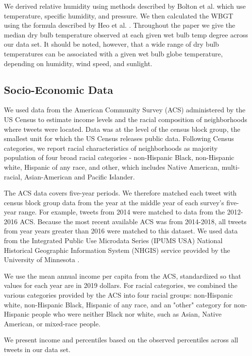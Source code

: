 \documentclass[fleqn,10pt]{wlscirep}
\begin{document}
We derived relative humidity using methods described by Bolton et al. \cite{bolton_computation_1980} which use temperature, specific humidity, and pressure. We then calculated the WBGT using the formula described by Heo et al. \cite{heo2019comparison}.  Throughout the paper we give the median dry bulb temperature observed at each given wet bulb temp degree across our data set. It should be noted, however, that a wide range of dry bulb temperatures can be associated with a given wet bulb globe temperature, depending on humidity, wind speed, and sunlight.

\subsection*{Socio-Economic Data}
We used data from the American Community Survey (ACS) administered by the US Census to estimate income levels and the racial composition of neighborhoods where tweets were located. Data was at the level of the census block group, the smallest unit for which the US Census releases public data. Following Census categories, we report racial characteristics of neighborhoods as majority population of four broad racial categories - non-Hispanic Black, non-Hispanic white, Hispanic of any race, and other, which includes Native American, multi-racial, Asian-American and Pacific Islander. 

The ACS data covers five-year periods. We therefore matched each tweet with census block group data from the year at the middle year of each survey's five-year range. For example, tweets from 2014 were matched to data from the 2012-2016 ACS. Because the most recent available ACS was from 2014-2018, all tweets from year years greater than 2016 were matched to this dataset. We used data from the Integrated Public Use Microdata Series (IPUMS USA) National Historical Geographic Information System (NHGIS) service provided by the University of Minnesota \cite{ruggles2018ipums}.

We use the mean annual income per capita from the ACS, standardized so that values for each year are in 2019 dollars. For racial categories, we combined the various categories provided by the ACS into four racial groups: non-Hispanic white, non-Hispanic Black, Hispanic of any race, and an "other" category for non-Hispanic people who were neither Black nor white, such as Asian, Native American, or mixed-race people.

We present income and percentiles based on the observed percentiles across all tweets in our data set.
 
\end{document}
